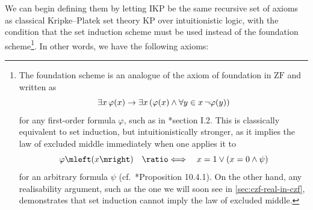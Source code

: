 \documentclass[12pt,openany]{book}
\theoremstyle{plain}
\theoremstyle{definition}
\newcommand\opA[1]{\mathop{\forall #1}}
\newcommand\opE[1]{\mathop{\exists #1}}
\newcommand\defeqv{\quad \ratio\Longleftrightarrow \quad}
\newcommand\KP{\mathrm{KP}}
\newcommand\IKP{\mathrm{IKP}}
\newcommand\ZF{\mathrm{ZF}}
\begin{document}
We can begin defining them by letting $\IKP$ be the same recursive set of axioms as classical Kripke--Platek set theory $\KP$ over intuitionistic logic, with the condition that the set induction scheme must be used instead of the foundation scheme\footnote{The foundation scheme is an analogue of the axiom of foundation in $\ZF$ and written as
  \[\opE{x} \varphi\mleft(x\mright) \rightarrow \opE{x} \left(\varphi\mleft(x\mright) \land \opA{y \in x} \neg \varphi\mleft(y\mright)\right)\]
  for any first-order formula $\varphi$, such as in \cite{barwise75-admissible-sets}*{section I.2}. This is classically equivalent to set induction, but intuitionistically stronger, as it implies the law of excluded middle immediately when one applies it to
  \[\varphi\mleft(x\mright) \defeqv x = 1 \lor \left(x = 0 \land \psi\right)\]
  for an arbitrary formula $\psi$ (cf.\ \cite{aczel-rathjen10-cst-book}*{Proposition 10.4.1}). On the other hand, any realisability argument, such as the one we will soon see in \autoref{sec:czf-real-in-czf}, demonstrates that set induction cannot imply the law of excluded middle.}. In other words, we have the following axioms:
\end{document}
